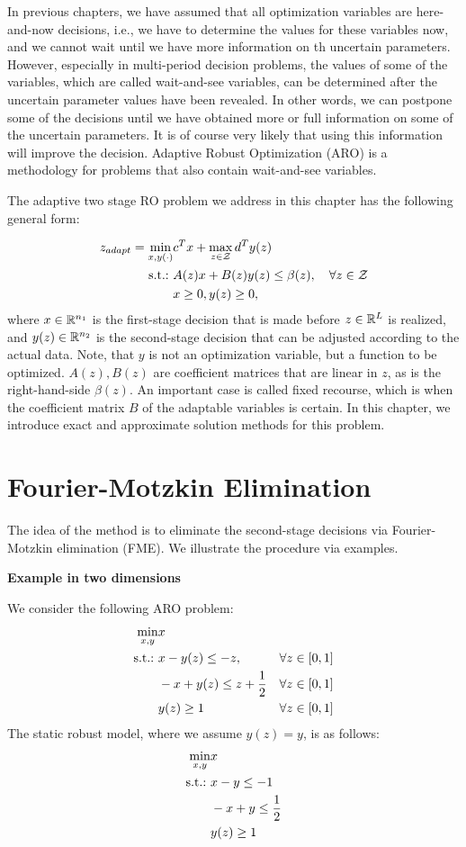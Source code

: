 In previous chapters, we have assumed that all optimization variables are here-and-now decisions, i.e., we have to determine the values for these variables now, and we cannot wait until we have more information on th uncertain parameters. However, especially in multi-period decision problems, the values of some of the variables, which are called wait-and-see variables, can be determined after the uncertain parameter values have been revealed. In other words, we can postpone some of the decisions until we have obtained more or full information on some of the uncertain parameters. It is of course very likely that using this information will improve the decision. Adaptive Robust Optimization (ARO) is a methodology for problems that also contain wait-and-see variables.

The adaptive two stage RO problem we address in this chapter has the following general form:

\begin{align}\label{p3c5:adaptiveprob}
z_{adapt} = \min\limits_{x,y(\cdot)} & c^T x + \max\limits_{z\in\mathcal{Z}} d^Ty(z) \\
\mathop{\text{s.t.:~}} & A(z)x+ B(z)y(z) \leq \beta(z),\quad\forall z\in\mathcal{Z} \\
& x\geq 0, y(z)\geq 0,
\end{align}
where $x\in\mathbb{R}^{n_1}$ is the first-stage decision that is made before $z\in\mathbb{R}^L$ is realized, and $y(z)\in\mathbb{R}^{n_2}$ is the second-stage decision that can be adjusted according to the actual data. Note, that $y$ is not an optimization variable, but a function to be optimized. $A(z),B(z)$ are coefficient matrices that are linear in $z$, as is the right-hand-side $\beta(z)$. An important case is called fixed recourse, which is when the coefficient matrix $B$ of the adaptable variables is certain. In this chapter, we introduce exact and approximate solution methods for this problem.

\section{Fourier-Motzkin Elimination}

The idea of the method is to eliminate the second-stage decisions via Fourier-Motzkin elimination (FME). We illustrate the procedure via examples.

\textbf{Example in two dimensions}

We consider the following ARO problem:
\begin{align}
\min\limits_{x,y} & x \\
\mathop{\text{s.t.:~}} & x-y(z)\leq -z, &\forall z\in [0,1] \\
& -x+y(z) \leq z + \frac{1}{2} &\forall z\in[0,1] \\
& y(z) \geq 1 &\forall z\in[0,1]
\end{align}
The static robust model, where we assume $y(z) = y$, is as follows:
\begin{align*}
\min\limits_{x,y} & x \\
\mathop{\text{s.t.:~}} & x-y\leq -1 \\
& -x+y \leq \frac{1}{2} \\
& y(z) \geq 1
\end{align*}

